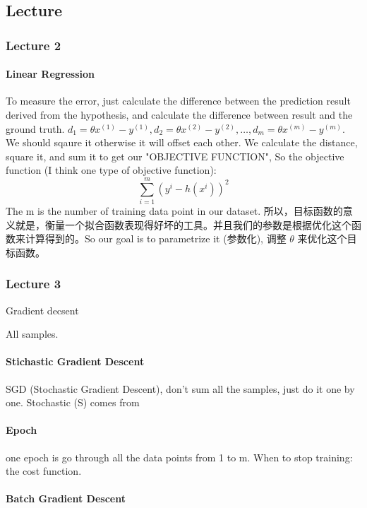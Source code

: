 \documentclass[a4paper]{article}
\begin{document}
\subsection{Lecture}

\subsubsection{Lecture 2}
\paragraph{Linear Regression}
To measure the error, just calculate the difference between the prediction result derived from the hypothesis, and calculate the difference between result and the ground truth. $d_{1}=\theta x^{(1)}-y^{(1)}, d_{2}=\theta x^{(2)}-y^{(2)}, \dots, d_{m}=\theta x^{(m)}-y^{(m)}$. We should sqaure it otherwise it will offset each other.
\newline
We calculate the distance, square it, and sum it to get our "OBJECTIVE FUNCTION", So the objective function (I think one type of objective function):
\begin{equation}
	\sum_{i=1}^{m}(y^{i}-h(x^{i}))^{2}
\end{equation}
The m is the number of training data point in our dataset.
\newline
所以，目标函数的意义就是，衡量一个拟合函数表现得好坏的工具。并且我们的参数是根据优化这个函数来计算得到的。So our goal is to parametrize it (参数化), 调整 $\theta$ 来优化这个目标函数。

\subsubsection{Lecture 3}
Gradient decsent 

All samples. 
\paragraph{Stichastic Gradient Descent} SGD (Stochastic Gradient Descent), don't sum all the samples, just do it one by one.
Stochastic (S) comes from 

\paragraph{Epoch} one epoch is go through all the data points from 1 to m.
When to stop training: the cost function.

\paragraph{Batch Gradient Descent}
\end{document}
